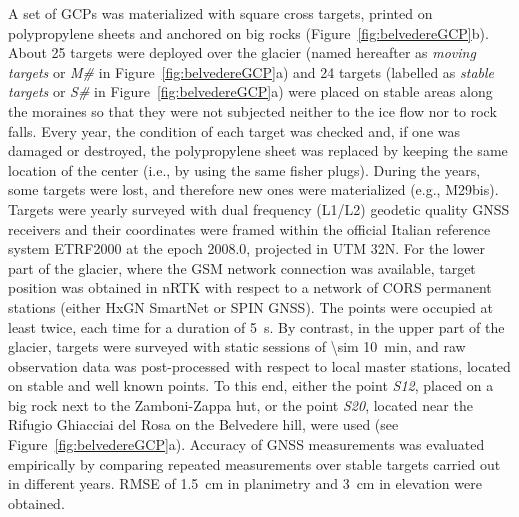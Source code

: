A set of GCPs was materialized with square cross targets, printed on polypropylene sheets
and anchored on big rocks (Figure~\ref{fig:belvedereGCP}b).
About 25 targets were deployed over the glacier (named hereafter as \textit{moving
    targets} or \textit{M\#} in Figure~\ref{fig:belvedereGCP}a) and 24 targets (labelled
as
\textit{stable targets} or \textit{S\#} in Figure~\ref{fig:belvedereGCP}a) were placed on
stable areas along the moraines so that they were not subjected neither to the ice flow
nor to rock falls.
Every year, the condition of each target was checked and, if one was damaged or
destroyed, the polypropylene sheet was replaced by keeping the same location of the
center (i.e., by using the same fisher plugs).
During the years, some targets were lost, and therefore new ones were materialized (e.g.,
M29bis).
Targets were yearly surveyed with dual frequency (L1/L2) geodetic quality GNSS receivers
and their coordinates were framed within the official Italian reference system ETRF2000
at the epoch 2008.0, projected in UTM 32N.
For the lower part of the glacier, where the GSM network connection was available, target
position was obtained in nRTK with respect to a network of CORS permanent stations
(either HxGN SmartNet or SPIN GNSS).
The points were occupied at least twice, each time for a duration of \qty{5}{\second}.
By contrast, in the upper part of the glacier, targets were surveyed with static sessions
of \qty{\sim 10}{\minute}, and raw observation data was post-processed with respect to
local master stations, located on stable and well known points.
To this end, either the point \textit{S12}, placed on a big rock next to the
Zamboni-Zappa hut, or the point \textit{S20}, located near the Rifugio Ghiacciai del Rosa
on the Belvedere hill,	were used (see Figure~\ref{fig:belvedereGCP}a).
Accuracy of GNSS measurements was evaluated empirically by comparing repeated
measurements over stable targets carried out in different years.
RMSE of \qty{1.5}{\centi\meter} in planimetry and \qty{3}{\centi\meter} in elevation were
obtained.

